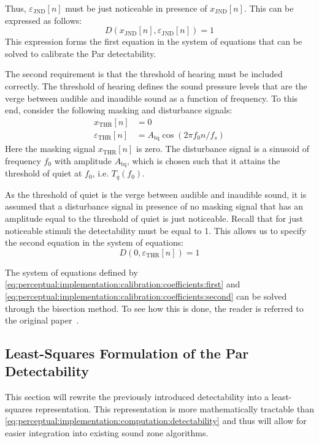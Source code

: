 Thus, $\varepsilon_\text{JND}[n]$ must be just noticeable in presence of $x_\text{JND}[n]$.
This can be expressed as follows:
\begin{equation}
    D(x_\text{JND}[n],\varepsilon_\text{JND}[n]) = 1
    \label{eq:perceptual:implementation:calibration:coefficients:first}
\end{equation}
This expression forms the first equation in the system of equations that can be solved to calibrate the Par detectability.

The second requirement is that the threshold of hearing must be included correctly.
The threshold of hearing defines the sound pressure levels that are the verge between audible and inaudible sound as a function of frequency.
To this end, consider the following masking and disturbance signals:
\begin{align}
    x_\text{THR}[n] &= 0 \\
    \varepsilon_\text{THR}[n] &= A_{\text{tq}}\cos\left(2\pi f_0 n / f_s\right)
\end{align}
Here the masking signal $x_\text{THR}[n]$ is zero. 
The disturbance signal is a sinusoid of frequency $f_0$ with amplitude $A_{\text{tq}}$, which is chosen such that it attains 
the threshold of quiet at $f_0$, i.e. $T_q(f_0)$. 

As the threshold of quiet is the verge between audible and inaudible sound, it is assumed that a disturbance signal in presence of no masking signal that has
an amplitude equal to the threshold of quiet is just noticeable.
Recall that for just noticeable stimuli the detectability must be equal to 1.
This allows us to specify the second equation in the system of equations:
\begin{equation}
    D(0,\varepsilon_\text{THR}[n]) = 1
    \label{eq:perceptual:implementation:calibration:coefficients:second}
\end{equation}

The system of equations defined by \autoref{eq:perceptual:implementation:calibration:coefficients:first} and 
\autoref{eq:perceptual:implementation:calibration:coefficients:second} can be solved through the bisection method.
To see how this is done, the reader is referred to the original paper~\cite{van2005perceptual}.

\subsection{Least-Squares Formulation of the Par Detectability}
\label{ch:perceptual:implementation:least_squares}
This section will rewrite the previously introduced detectability into a least-squares representation. 
This representation is more mathematically tractable than \autoref{eq:perceptual:implementation:computation:detectability} and thus 
will allow for easier integration into existing sound zone algorithms.

